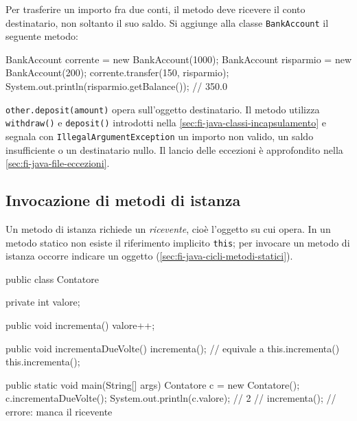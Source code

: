 \clearpage

\begin{example}
Per trasferire un importo fra due conti, il metodo deve ricevere
il conto destinatario, non soltanto il suo saldo. Si aggiunge
alla classe \texttt{BankAccount} il seguente metodo:



\begin{unipdcode}[language=Java]
BankAccount corrente = new BankAccount(1000);
BankAccount risparmio = new BankAccount(200);
corrente.transfer(150, risparmio);
System.out.println(risparmio.getBalance()); // 350.0
\end{unipdcode}

\texttt{other.deposit(amount)} opera sull'oggetto destinatario.
Il metodo utilizza \texttt{withdraw()} e \texttt{deposit()}
introdotti nella \cref{sec:fi-java-classi-incapsulamento} e segnala
con \texttt{IllegalArgumentException} un importo non valido,
un saldo insufficiente o un destinatario nullo. Il lancio delle
eccezioni è approfondito nella \cref{sec:fi-java-file-eccezioni}.
\end{example}

\subsection{Invocazione di metodi di istanza}
\label{sec:fi-java-file-metodi-ricevente}

Un metodo di istanza richiede un \emph{ricevente}, cioè l'oggetto
su cui opera. In un metodo statico non esiste il riferimento implicito
\texttt{this}; per invocare un metodo di istanza occorre indicare
un oggetto (\cref{sec:fi-java-cicli-metodi-statici}).

\begin{unipdcode}[language=Java]
public class Contatore {
    private int valore;

    public void incrementa() {
        valore++;
    }

    public void incrementaDueVolte() {
        incrementa();       // equivale a this.incrementa()
        this.incrementa();
    }

    public static void main(String[] args) {
        Contatore c = new Contatore();
        c.incrementaDueVolte();
        System.out.println(c.valore);  // 2
        // incrementa(); // errore: manca il ricevente
    }
}
\end{unipdcode}

